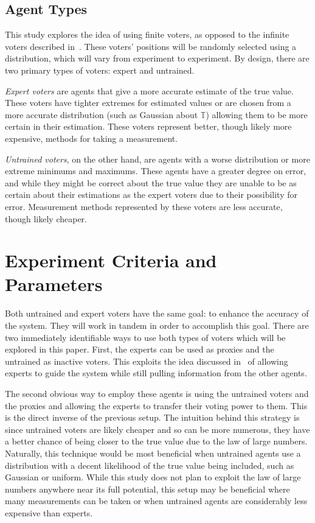\subsection{Agent Types}\label{subsec:agent-types}
This study explores the idea of using finite voters, as opposed to the
infinite voters described in~\cite{Cohensius2017}.
These voters' positions will be randomly selected using a distribution, which
will vary from experiment to experiment.
By design, there are two primary types of voters: expert and untrained.

\textit{Expert voters} are agents that give a more accurate estimate of the
true value.
These voters have tighter extremes for estimated values or are chosen from
a more accurate distribution (such as Gaussian about $\mathbb{T}$) allowing
them to be more certain in their estimation.
These voters represent better, though likely more expensive, methods for
taking a measurement.  %

\textit{Untrained voters}, on the other hand, are agents with a worse
distribution or more extreme minimums and maximums.
These agents have a greater degree on error, and while they might be correct
about the true value they are unable to be as certain about their estimations
as the expert voters due to their possibility for error.
Measurement methods represented by these voters are less accurate, though
likely cheaper.  %


\section{Experiment Criteria and Parameters}\label{sec:experiment-criteria
-and-parameters}
Both untrained and expert voters have the same goal: to enhance the accuracy of
the system.
They will work in tandem in order to accomplish this goal.
There are two immediately identifiable ways to use both types of voters which
will be explored in this paper.
First, the experts can be used as proxies and the untrained as inactive voters.
This exploits the idea discussed in~\cite{Miller1969, Mueller1972} of
allowing experts to guide the system while still pulling information from the
other agents.

The second obvious way to employ these agents is using the untrained voters
and the proxies and allowing the experts to transfer their voting power to them.
This is the direct inverse of the previous setup.
The intuition behind this strategy is since untrained voters are likely
cheaper and so can be more numerous, they have a better chance of being closer
to the true value due to the law of large numbers.
Naturally, this technique would be most beneficial when untrained agents use a
distribution with a decent likelihood of the true value being included, such
as Gaussian or uniform.
While this study does not plan to exploit the law of large numbers anywhere
near its full potential, this setup may be beneficial where many measurements
can be taken or when untrained agents are considerably less expensive than
experts.

